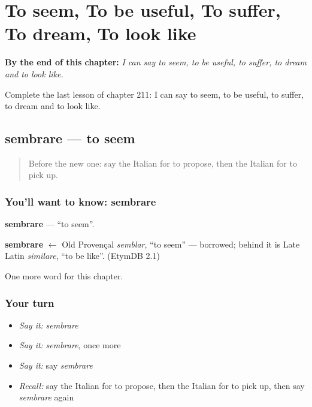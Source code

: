 
\chapter{To seem, To be useful, To suffer, To dream, To look like}
\label{ch:it-to-seem-to-be-useful-to-suffer-to-dream-to-look-like}

\begin{chapteropening}
\textbf{By the end of this chapter:} \emph{I can say to seem, to be useful, to suffer, to dream and to look like.}

Complete the last lesson of chapter 211: I can say to seem, to be useful, to suffer, to dream and to look like.
\end{chapteropening}

\section[sembrare]{sembrare — to seem}

\label{lesson:IT-C211-sembrare}



\begin{quote}
Before the new one: say the Italian for to propose, then the Italian for to pick up.
\end{quote}

\subsection*{You'll want to know: sembrare}
\textbf{sembrare} — \textquotedblleft{}to seem\textquotedblright{}.

\begin{cousinweb}
\textbf{sembrare} $\leftarrow$ Old Provençal \emph{semblar}, \textquotedblleft{}to seem\textquotedblright{} — borrowed; behind it is Late Latin \emph{similare}, \textquotedblleft{}to be like\textquotedblright{}. (EtymDB 2.1)
\end{cousinweb}

\begin{grammarlens}[title={What you've built}]
One more word for this chapter.
\end{grammarlens}

\subsection*{Your turn}
\begin{itemize}
\raggedright
  \item \emph{Say it:} \emph{sembrare}
  \item \emph{Say it:} \emph{sembrare}, once more
  \item \emph{Say it:} say \emph{sembrare}
  \item \emph{Recall:} say the Italian for to propose, then the Italian for to pick up, then say \emph{sembrare} again
\end{itemize}

